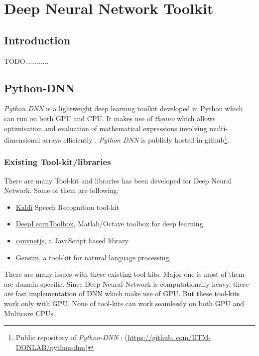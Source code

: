 \chapter{Deep Neural Network Toolkit} 
\label{chap:python-dnn}
\section{Introduction}
TODO............

\section{Python-DNN}
\textit{Python DNN} is a lightweight deep learning toolkit developed in Python which can run on both GPU and CPU. It makes use of \emph{theano} which allows optimisation and evaluation of mathematical expressions involving multi-dimensional arrays efficiently \cite{bergstra2010theano}. \textit{Python DNN} is publicly hosted in github\footnote{Public repository of \textit{Python-DNN} : (\url{https://github. com/IITM-DONLAB/python-dnn})}.

\subsection{Existing Tool-kit/libraries}
There are many Tool-kit and libraries has been developed for Deep Neural Network. Some of them are following: 
\begin{itemize}
\item \href{http://kaldi.sourceforge.net/}{Kaldi} Speech Recognition tool-kit
\item \href{https://github.com/rasmusbergpalm/DeepLearnToolbox}{DeepLearnToolbox}, Matlab/Octave toolbox for deep learning
\item \href{http://cs.stanford.edu/people/karpathy/convnetjs/}{convnetjs}, a JavaScript based library
\item \href{https://radimrehurek.com/gensim}{Gensim}, a tool-kit for natural language processing
\end{itemize}

There are many issues with these existing tool-kits. Major one is most of them are domain specific. Since Deep Neural Network is computationally heavy, there are fast implementation of DNN which make use of GPU. But these tool-kits work only with GPU. None of tool-kits can work seamlessly on both GPU and Multicore CPUs. 

